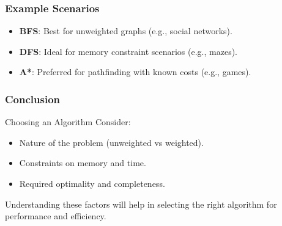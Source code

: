 \documentclass[aspectratio=169]{beamer}
\begin{document}
\begin{frame}[fragile]
    \frametitle{Example Scenarios}
    \begin{itemize}
        \item \textbf{BFS}: Best for unweighted graphs (e.g., social networks).
        \item \textbf{DFS}: Ideal for memory constraint scenarios (e.g., mazes).
        \item \textbf{A*}: Preferred for pathfinding with known costs (e.g., games).
    \end{itemize}
\end{frame}

\begin{frame}[fragile]
    \frametitle{Conclusion}
    \begin{block}{Choosing an Algorithm}
        Consider:
        \begin{itemize}
            \item Nature of the problem (unweighted vs weighted).
            \item Constraints on memory and time.
            \item Required optimality and completeness.
        \end{itemize}
        Understanding these factors will help in selecting the right algorithm for performance and efficiency.
    \end{block}
\end{frame}
\end{document}
